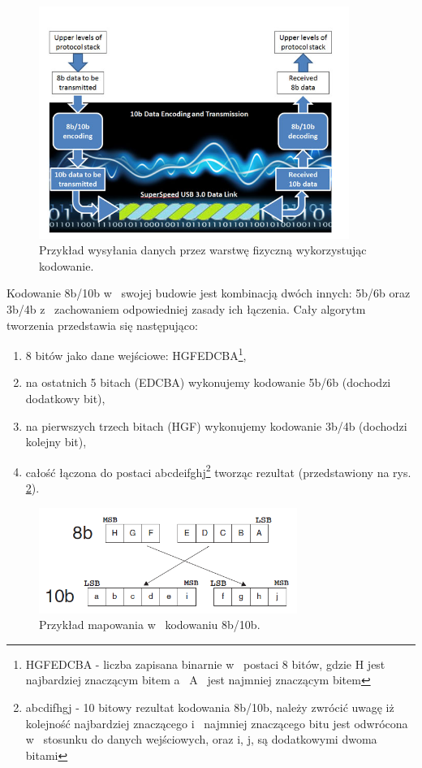 \documentclass{BscUS}
\begin{document}
\begin{figure}[H]
\centering
\includegraphics[width=0.9\textwidth]{./img/SendingData}
\caption{Przykład wysyłania danych przez warstwę fizyczną wykorzystując kodowanie. \cite{SendingData}}
\label{fig:sendingDataThroughPHYLayer}
\end{figure}
\indent Kodowanie 8b/10b w~ swojej budowie jest kombinacją dwóch innych: 5b/6b oraz 3b/4b z~ zachowaniem odpowiedniej zasady ich łączenia. Cały algorytm tworzenia przedstawia się następująco:
\begin{enumerate}
\item 8 bitów jako dane wejściowe: HGFEDCBA\footnote{HGFEDCBA - liczba zapisana binarnie w~ postaci 8 bitów, gdzie H jest najbardziej znaczącym bitem a~ A~ jest najmniej znaczącym bitem},
\item na ostatnich 5 bitach (EDCBA) wykonujemy kodowanie 5b/6b (dochodzi dodatkowy bit),
\item na pierwszych trzech bitach (HGF) wykonujemy kodowanie 3b/4b (dochodzi kolejny bit),
\item całość łączona do postaci abcdeifghj\footnote{abcdifhgj - 10 bitowy rezultat kodowania 8b/10b, należy zwrócić uwagę iż kolejność najbardziej znaczącego i~ najmniej znaczącego bitu jest odwrócona w~ stosunku do danych wejściowych, oraz i, j, są dodatkowymi dwoma bitami} tworząc rezultat (przedstawiony na rys. \ref{fig:810mapping}).
\end{enumerate}
\begin{figure}[H]
\centering
\includegraphics[width=0.75\textwidth]{./img/mapping810}
\caption{Przykład mapowania w~ kodowaniu 8b/10b. \cite{mapping810}}
\label{fig:810mapping}
\end{figure}
\end{document}
